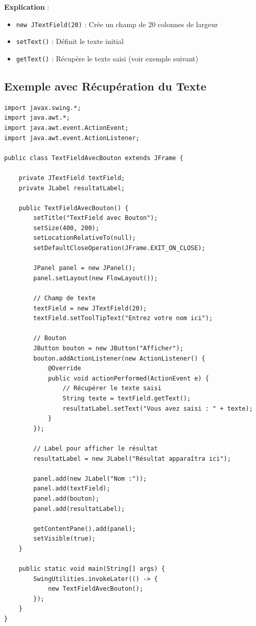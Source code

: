 \documentclass[11pt,a4paper]{article}
\begin{document}
\textbf{Explication} :
\begin{itemize}
    \item \texttt{new JTextField(20)} : Crée un champ de 20 colonnes de largeur
    \item \texttt{setText()} : Définit le texte initial
    \item \texttt{getText()} : Récupère le texte saisi (voir exemple suivant)
\end{itemize}

\subsection{Exemple avec Récupération du Texte}

\begin{lstlisting}
import javax.swing.*;
import java.awt.*;
import java.awt.event.ActionEvent;
import java.awt.event.ActionListener;

public class TextFieldAvecBouton extends JFrame {
    
    private JTextField textField;
    private JLabel resultatLabel;
    
    public TextFieldAvecBouton() {
        setTitle("TextField avec Bouton");
        setSize(400, 200);
        setLocationRelativeTo(null);
        setDefaultCloseOperation(JFrame.EXIT_ON_CLOSE);
        
        JPanel panel = new JPanel();
        panel.setLayout(new FlowLayout());
        
        // Champ de texte
        textField = new JTextField(20);
        textField.setToolTipText("Entrez votre nom ici");
        
        // Bouton
        JButton bouton = new JButton("Afficher");
        bouton.addActionListener(new ActionListener() {
            @Override
            public void actionPerformed(ActionEvent e) {
                // Récupérer le texte saisi
                String texte = textField.getText();
                resultatLabel.setText("Vous avez saisi : " + texte);
            }
        });
        
        // Label pour afficher le résultat
        resultatLabel = new JLabel("Résultat apparaîtra ici");
        
        panel.add(new JLabel("Nom :"));
        panel.add(textField);
        panel.add(bouton);
        panel.add(resultatLabel);
        
        getContentPane().add(panel);
        setVisible(true);
    }
    
    public static void main(String[] args) {
        SwingUtilities.invokeLater(() -> {
            new TextFieldAvecBouton();
        });
    }
}
\end{lstlisting}
\end{document}
